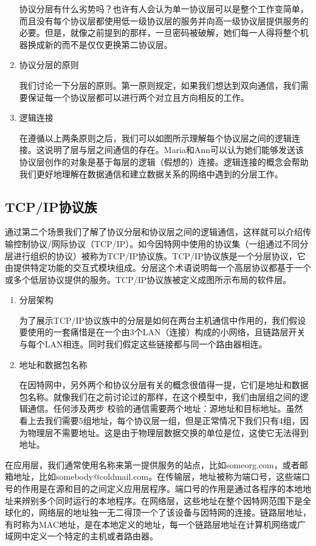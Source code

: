 \begin{enumerate}
	协议分层有什么劣势吗？也许有人会认为单一协议层可以是整个工作变简单，而且没有每个协议层都使用低一级协议层的服务并向高一级协议层提供服务的必要。但是，就像之前提到的那样，一旦密码被破解，她们每一人得将整个机器换成新的而不是仅仅更换第二协议层。
	\item 协议分层的原则

	我们讨论一下分层的原则。第一原则规定，如果我们想达到双向通信，我们需要保证每一个协议层都可以进行两个对立且方向相反的工作。

	\item 逻辑连接

	在遵循以上两条原则之后，我们可以如图所示理解每个协议层之间的逻辑连接。这说明了层与层之间通信的存在。Maria和Ann可以认为她们能够发送该协议层创作的对象是基于每层的逻辑（假想的）连接。逻辑连接的概念会帮助我们更好地理解在数据通信和建立数据关系的网络中遇到的分层工作。

\end{enumerate}
\subsection{TCP/IP协议族}
通过第二个场景我们了解了协议分层和协议层之间的逻辑通信，这样就可以介绍传输控制协议/网际协议（TCP/IP）。如今因特网中使用的协议集（一组通过不同分层进行组织的协议）被称为TCP/IP协议族。TCP/IP协议族是一个分层协议，它由提供特定功能的交互式模块组成。分层这个术语说明每一个高层协议都基于一个或多个低层协议提供的服务。TCP/IP协议族被定义成图所示布局的软件层。
\begin{enumerate}
	\item 分层架构

	为了展示TCP/IP协议族中的分层是如何在两台主机通信中作用的，我们假设要使用的一套痛惜是在一个由3个LAN（连接）构成的小网络，且链路层开关与每个LAN相连。同时我们假定这些链接都与同一个路由器相连。

	\item 地址和数据包名称

	在因特网中，另外两个和协议分层有关的概念很值得一提，它们是地址和数据包名称。就像我们在之前讨论过的那样，在这个模型中，我们由层组之间的逻辑通信。任何涉及两步 校验的通信需要两个地址：源地址和目标地址。虽然看上去我们需要5组地址，每个协议层一组，但是正常情况下我们只有4组，因为物理层不需要地址。这是由于物理层数据交换的单位是位，这使它无法得到地址。
\end{enumerate}

	在应用层，我们通常使用名称来第一提供服务的站点，比如someorg.com，或者邮箱地址，比如somebody@coldmail.com。在传输层，地址被称为端口号，这些端口号的作用是在源和目的之间定义应用层程序。端口号的作用是通过各程序的本地地址来辨别多个同时运行的本地程序。在网络层，这些地址在整个因特网范围下是全球化的，网络层的地址独一无二得顶一个了该设备与因特网的连接。链路层地址，有时称为MAC地址，是在本地定义的地址，每一个链路层地址在计算机网络或广域网中定义一个特定的主机或者路由器。
